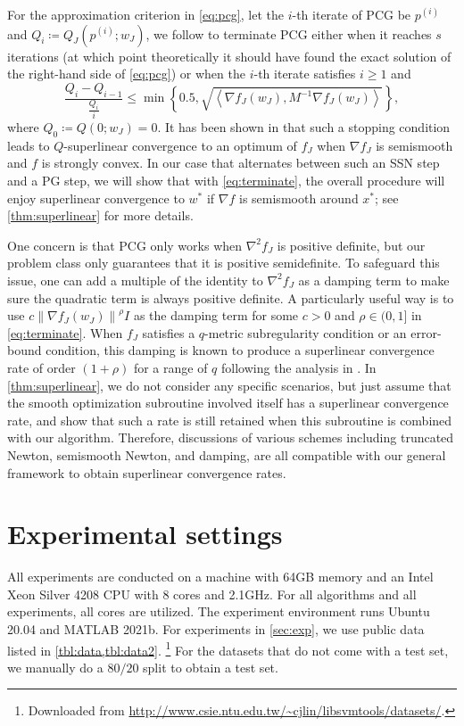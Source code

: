 \documentclass{article}
\newcommand{\Alert}[1]{{ #1}}
\theoremstyle{plain}
\theoremstyle{definition}
\theoremstyle{remark}
\newcommand*{\lmss}{\fontfamily{lmss}\selectfont}
\newcommand\inner[2]{\left\langle #1, #2 \right\rangle}
\newcommand{\norm}[1]{{\left\|{#1}\right\|}}
\def\news{{\lmss news20}\xspace}
\def\webspam{{\lmss webspam}\xspace}
\begin{document}
For the approximation criterion in \cref{eq:pcg}, let the $i$-th
iterate of PCG be $p^{(i)}$ and $Q_i \coloneqq Q_J(p^{(i)};w_J)$, we
follow \cite{GalL21a} to terminate PCG either when it reaches $s$
iterations (at which point theoretically it should have found the
exact solution of the right-hand side of \cref{eq:pcg}) or when the
$i$-th iterate satisfies $i \geq 1$ and
\begin{equation}
\frac{Q_i - Q_{i-1}}{\frac{Q_i}{i}} \leq \min\left\{ 0.5,
	\sqrt{\inner{\nabla f_J(w_J)}{M^{-1} \nabla f_J(w_J)}}\right\},
	\label{eq:terminate}
\end{equation}
where $Q_0 \coloneqq Q(0;w_J) = 0$.
It has been shown in \cite{GalL21a} that such a stopping condition
leads to $Q$-superlinear convergence to an optimum of $f_{J}$ when
$\nabla f_J$ is semismooth and $f$ is strongly convex.
In our case that alternates between such an SSN step and a PG step, we
will show that with \cref{eq:terminate}, the overall procedure will
enjoy superlinear convergence to $w^*$ if $\nabla f$ is semismooth
around $x^*$; see \cref{thm:superlinear} for more details.

One concern is that PCG only works when $\nabla^2 f_J$ is positive
definite, but our problem class only guarantees that it is positive
semidefinite.
To safeguard this issue, one can add a multiple of the identity to $\nabla^2
f_J$ as a damping term to make sure the quadratic term is always
positive definite.
A particularly useful way is to use $c \norm{\nabla f_J(w_J)}^\rho I$
as
the damping term for some $c>0$ and $\rho \in (0,1]$ in
\cref{eq:terminate}.
When $f_{J}$ satisfies a $q$-metric subregularity condition or an
error-bound condition,
this damping is known to produce a superlinear convergence rate of
order $(1+\rho)$ for a range of $q$ following the analysis in
\cite{MCY19a,MorYZZ20a}.
In \cref{thm:superlinear}, we do not consider any specific scenarios,
but just assume that the smooth optimization subroutine involved
itself has a superlinear convergence rate, and show that such a rate is
still retained when this subroutine is combined with our algorithm.
Therefore, discussions of various schemes including truncated Newton,
semismooth Newton, and damping, are all compatible with our general
framework to obtain superlinear convergence rates.


\section{Experimental settings}
\label{app:expdetails}
All experiments are conducted on a machine with 64GB memory and an Intel Xeon 
Silver 4208 CPU with 8 cores and 2.1GHz.
For all algorithms and all experiments, all cores are utilized.
The experiment environment runs Ubuntu 20.04 and MATLAB 2021b.
For experiments in \cref{sec:exp}, we use public data listed in \Alert{
\cref{tbl:data,tbl:data2}}.
\footnote{Downloaded from
	\url{http://www.csie.ntu.edu.tw/~cjlin/libsvmtools/datasets/}.} For the 
	datasets 
	that do not come with a test set, we manually do a $80/20$ split to obtain 
	a test set.
\end{document}
